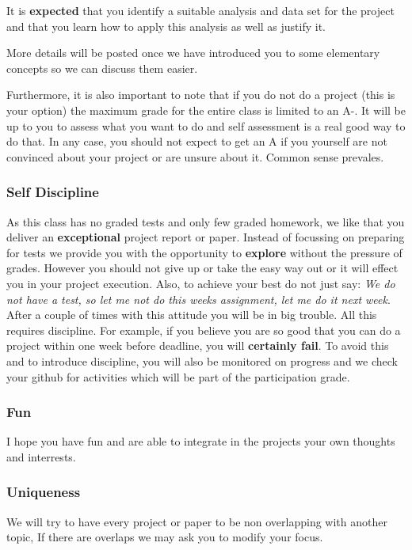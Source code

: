 It is \textbf{expected} that you identify a suitable analysis and data
set for the project and that you learn how to apply this analysis as
well as justify it.

More details will be posted once we have introduced you to some
elementary concepts so we can discuss them easier.

Furthermore, it is also important to note that if you do not do a
project (this is your option) the maximum grade for the entire class is
limited to an A-. It will be up to you to assess what you want to do and
self assessment is a real good way to do that. In any case, you should
not expect to get an A if you yourself are not convinced about your
project or are unsure about it. Common sense prevales.

\subsubsection{Self Discipline}\label{self-discipline}

As this class has no graded tests and only few graded homework, we like
that you deliver an \textbf{exceptional} project report or paper.
Instead of focussing on preparing for tests we provide you with the
opportunity to \textbf{explore} without the pressure of grades. However
you should not give up or take the easy way out or it will effect you in
your project execution. Also, to achieve your best do not just say:
\emph{We do not have a test, so let me not do this weeks assignment, let
me do it next week}. After a couple of times with this attitude you will
be in big trouble. All this requires discipline. For example, if you
believe you are so good that you can do a project within one week before
deadline, you will \textbf{certainly fail}. To avoid this and to
introduce discipline, you will also be monitored on progress and we
check your github for activities which will be part of the participation
grade.

\subsubsection{Fun}\label{fun}

I hope you have fun and are able to integrate in the projects your own
thoughts and interrests.

\subsubsection{Uniqueness}\label{uniqueness}

We will try to have every project or paper to be non overlapping with
another topic, If there are overlaps we may ask you to modify your
focus.
